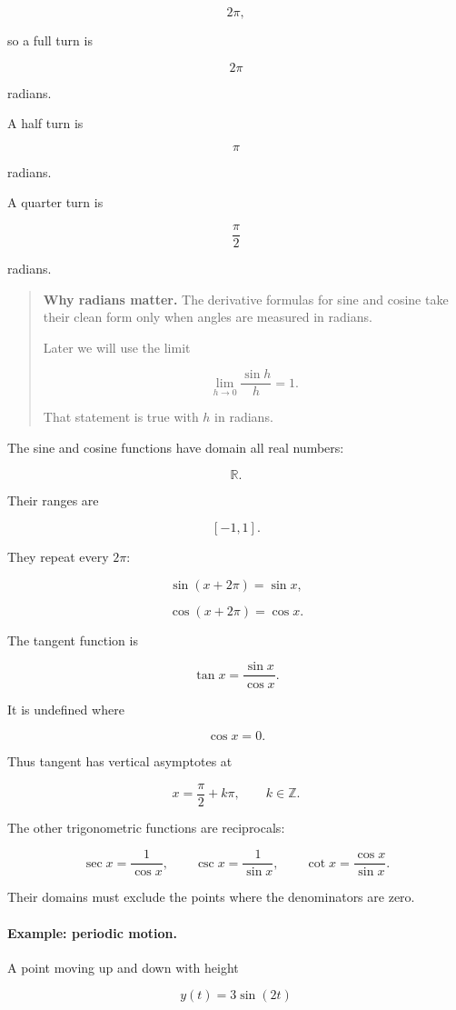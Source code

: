 \[
2\pi,
\]

so a full turn is

\[
2\pi
\]

radians.

A half turn is

\[
\pi
\]

radians.

A quarter turn is

\[
\frac{\pi}{2}
\]

radians.

\begin{quote}
\textbf{Why radians matter.}
The derivative formulas for sine and cosine take their clean form only when angles are measured in radians.

Later we will use the limit

\[
\lim_{h\to0}\frac{\sin h}{h}=1.
\]

That statement is true with \(h\) in radians.
\end{quote}

The sine and cosine functions have domain all real numbers:

\[
\mathbb R.
\]

Their ranges are

\[
[-1,1].
\]

They repeat every \(2\pi\):

\[
\sin(x+2\pi)=\sin x,
\]

\[
\cos(x+2\pi)=\cos x.
\]

The tangent function is

\[
\tan x=\frac{\sin x}{\cos x}.
\]

It is undefined where

\[
\cos x=0.
\]

Thus tangent has vertical asymptotes at

\[
x=\frac{\pi}{2}+k\pi,
\qquad k\in\mathbb Z.
\]

The other trigonometric functions are reciprocals:

\[
\sec x=\frac{1}{\cos x},
\qquad
\csc x=\frac{1}{\sin x},
\qquad
\cot x=\frac{\cos x}{\sin x}.
\]

Their domains must exclude the points where the denominators are zero.

\paragraph{Example: periodic motion.}
A point moving up and down with height

\[
y(t)=3\sin(2t)
\]

